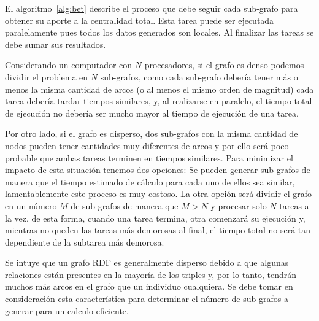 El algoritmo~\ref{alg:bet} describe el proceso que debe seguir cada sub-grafo
para obtener su aporte a la centralidad total. Esta tarea puede ser ejecutada
paralelamente pues todos los datos generados son locales.
Al finalizar las tareas se debe sumar sus resultados.

Considerando un computador con $N$ procesadores, si el grafo es denso podemos
dividir el problema en $N$ sub-grafos, como cada sub-grafo debería tener más o
menos la misma cantidad de arcos (o al menos el mismo orden de magnitud)
cada tarea debería tardar tiempos similares, y, al realizarse en paralelo, el
tiempo total de ejecución no debería ser mucho mayor al tiempo de ejecución de
una tarea.

Por otro lado, si el grafo es disperso, dos sub-grafos con la misma cantidad de
nodos pueden tener cantidades muy diferentes de arcos y por ello será poco
probable que ambas tareas terminen en tiempos similares. Para minimizar el
impacto de esta situación tenemos dos opciones: Se pueden generar sub-grafos de
manera que el tiempo estimado de cálculo para cada uno de ellos sea similar,
lamentablemente este proceso es muy costoso.
La otra opción será dividir el grafo en un
número $M$ de sub-grafos de manera que $M > N$ y procesar solo $N$ tareas a la
vez, de esta forma, cuando una tarea termina, otra comenzará su ejecución y,
mientras no queden las tareas más demorosas al final, el tiempo total no será
tan dependiente de la subtarea más demorosa.



Se intuye que un grafo RDF es generalmente disperso debido a que algunas 
relaciones están presentes en la mayoría de los triples y, por lo tanto, tendrán
muchos más arcos en el grafo que un individuo cualquiera. Se debe tomar en
consideración esta característica para determinar el número de sub-grafos a
generar para un calculo eficiente.
